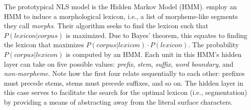 The prototypical NLS model is the Hidden Markov Model (HMM). 
\cite{creutz-and-lagus:2005, creutz-and-lagus:2007} employ an HMM to induce a morphological lexicon, i.e., a list of morpheme-like segments they call \textit{morphs}. 
Their algorithm seeks to find the lexicon such that $P(lexicon|corpus)$ is maximized. Due to Bayes' theorem, this equates to finding the lexicon that maximizes $P(corpus|lexicon) \cdot P(lexicon)$. The probability $P(corpus|lexicon)$ is computed by an HMM. Each unit in this HMM's hidden layer can take on five possible values: \textit{prefix}, \textit{stem}, \textit{suffix}, \textit{word boundary}, and \textit{non-morpheme}. 
Note how the first four relate sequentially to each other: prefixes must precede stems, stems must precede suffixes, and so on.
The hidden layer in this case serves to facilitate the search for the optimal lexicon 
(i.e., segmentation) by providing a means of abstracting away from the literal surface characters.

